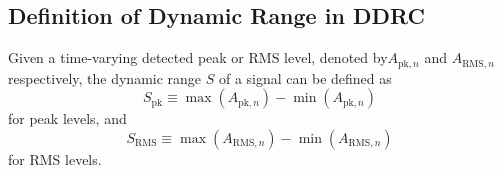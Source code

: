 \documentclass[../main2.tex]{subfiles}
\begin{document}
\subsection{Definition of Dynamic Range in DDRC}
Given a time-varying detected peak or RMS level,  denoted by$A_{\text{pk},n}$ and $A_{\text{RMS},n}$ respectively, the dynamic range $S$ of a signal can be defined as
\begin{equation}\label{eq:s_peak}
S_\text{pk} \equiv \max(A_{\text{pk},n}) - \min(A_{\text{pk},n})
\end{equation}
for peak levels, and
\begin{equation}\label{eq:s_RMS}
S_\text{RMS} \equiv \max(A_{\text{RMS},n}) - \min(A_{\text{RMS},n})
\end{equation}
for RMS levels.
\end{document}
